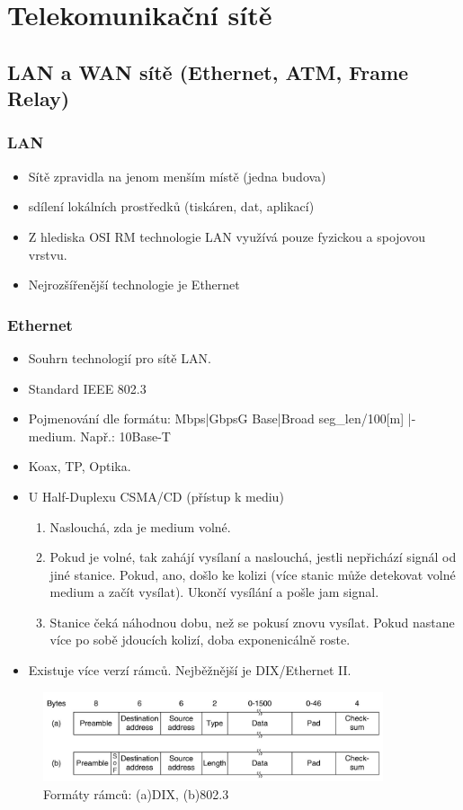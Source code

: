 \documentclass[10pt,a4paper]{article}
\begin{document}
\newpage
\section{Telekomunikační sítě}
\subsection{LAN a WAN sítě (Ethernet, ATM, Frame Relay)}
\subsubsection{LAN}
\begin{itemize}
\item Sítě zpravidla na jenom menším místě (jedna budova)
\item sdílení lokálních prostředků (tiskáren, dat, aplikací)
\item Z hlediska OSI RM technologie LAN využívá pouze fyzickou a spojovou vrstvu.
\item Nejrozšířenější technologie je Ethernet
\end{itemize}

\subsubsection{Ethernet} \label{sec:ethernet}
\begin{itemize}
\item Souhrn technologií pro sítě LAN.
\item Standard IEEE 802.3
\item Pojmenování dle formátu: {Mbps|GbpsG} {Base|Broad} {seg\_{}len/100[m] |-medium}. Např.: 10Base-T
\item Koax, TP, Optika.
\item U Half-Duplexu CSMA/CD (přístup k mediu)
\begin{enumerate}
\item Naslouchá, zda je medium volné.
\item Pokud je volné, tak zahájí vysílaní a naslouchá, jestli nepřichází signál od jiné stanice. Pokud, ano, došlo ke kolizi (více stanic může detekovat volné medium a začít vysílat). Ukončí vysílání a pošle jam signal.
\item Stanice čeká náhodnou dobu, než se pokusí znovu vysílat. Pokud nastane více po sobě jdoucích kolizí, doba exponenicálně roste.
\end{enumerate}
\item Existuje více verzí rámců. Nejběžnější je DIX/Ethernet II.
\end{itemize}
\begin{figure}[ht]
    \centering
    \includegraphics[width=10cm]{802frameFormat.jpg}
    \caption{Formáty rámců: (a)DIX, (b)802.3}
    \label{fig:802frameFormat}
\end{figure}
\end{document}

